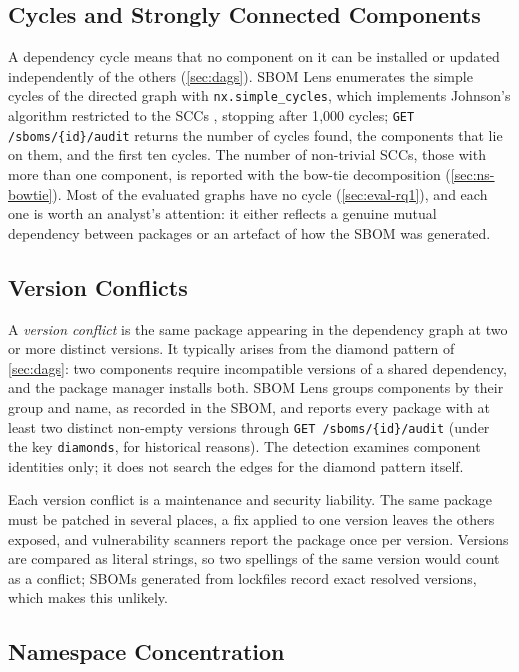 \subsection{Cycles and Strongly Connected Components}
\label{sec:ns-cycles}

A dependency cycle means that no component on it can be installed or updated independently of the others (\autoref{sec:dags}). SBOM Lens enumerates the simple cycles of the directed graph with \texttt{nx.simple\_cycles}, which implements Johnson's algorithm restricted to the SCCs \citep{Johnson1975}, stopping after 1{,}000 cycles; \texttt{GET /sboms/\{id\}/audit} returns the number of cycles found, the components that lie on them, and the first ten cycles. The number of non-trivial SCCs, those with more than one component, is reported with the bow-tie decomposition (\autoref{sec:ns-bowtie}). Most of the evaluated graphs have no cycle (\autoref{sec:eval-rq1}), and each one is worth an analyst's attention: it either reflects a genuine mutual dependency between packages or an artefact of how the SBOM was generated.


\subsection{Version Conflicts}
\label{sec:ns-version-conflicts}

A \textit{version conflict} is the same package appearing in the dependency graph at two or more distinct versions. It typically arises from the diamond pattern of \autoref{sec:dags}: two components require incompatible versions of a shared dependency, and the package manager installs both. SBOM Lens groups components by their group and name, as recorded in the SBOM, and reports every package with at least two distinct non-empty versions through \texttt{GET /sboms/\{id\}/audit} (under the key \texttt{diamonds}, for historical reasons). The detection examines component identities only; it does not search the edges for the diamond pattern itself.

Each version conflict is a maintenance and security liability. The same package must be patched in several places, a fix applied to one version leaves the others exposed, and vulnerability scanners report the package once per version. Versions are compared as literal strings, so two spellings of the same version would count as a conflict; SBOMs generated from lockfiles record exact resolved versions, which makes this unlikely.


\subsection{Namespace Concentration}
\label{sec:ns-concentration}


